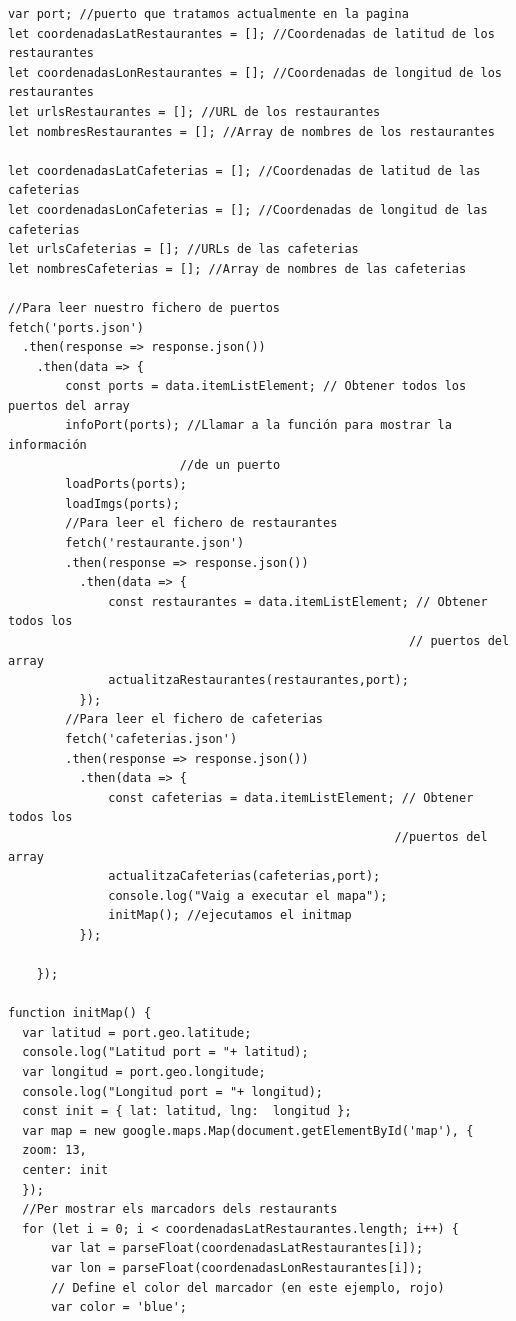 \documentclass{article}
\begin{document}
\begin{verbatim}
var port; //puerto que tratamos actualmente en la pagina
let coordenadasLatRestaurantes = []; //Coordenadas de latitud de los restaurantes
let coordenadasLonRestaurantes = []; //Coordenadas de longitud de los restaurantes
let urlsRestaurantes = []; //URL de los restaurantes 
let nombresRestaurantes = []; //Array de nombres de los restaurantes 

let coordenadasLatCafeterias = []; //Coordenadas de latitud de las cafeterias
let coordenadasLonCafeterias = []; //Coordenadas de longitud de las cafeterias
let urlsCafeterias = []; //URLs de las cafeterias 
let nombresCafeterias = []; //Array de nombres de las cafeterias 

//Para leer nuestro fichero de puertos
fetch('ports.json')
  .then(response => response.json())
    .then(data => {
        const ports = data.itemListElement; // Obtener todos los puertos del array
        infoPort(ports); //Llamar a la función para mostrar la información 
                        //de un puerto
        loadPorts(ports); 
        loadImgs(ports);
        //Para leer el fichero de restaurantes
        fetch('restaurante.json')
        .then(response => response.json())
          .then(data => {
              const restaurantes = data.itemListElement; // Obtener todos los 
                                                        // puertos del array
              actualitzaRestaurantes(restaurantes,port);
          });
        //Para leer el fichero de cafeterias
        fetch('cafeterias.json')
        .then(response => response.json())
          .then(data => {
              const cafeterias = data.itemListElement; // Obtener todos los 
                                                      //puertos del array
              actualitzaCafeterias(cafeterias,port);
              console.log("Vaig a executar el mapa");
              initMap(); //ejecutamos el initmap
          });
        
    });

function initMap() {
  var latitud = port.geo.latitude;
  console.log("Latitud port = "+ latitud);
  var longitud = port.geo.longitude;
  console.log("Longitud port = "+ longitud);
  const init = { lat: latitud, lng:  longitud };
  var map = new google.maps.Map(document.getElementById('map'), {
  zoom: 13,
  center: init
  });
  //Per mostrar els marcadors dels restaurants
  for (let i = 0; i < coordenadasLatRestaurantes.length; i++) {
      var lat = parseFloat(coordenadasLatRestaurantes[i]);
      var lon = parseFloat(coordenadasLonRestaurantes[i]);
      // Define el color del marcador (en este ejemplo, rojo)
      var color = 'blue';


\end{verbatim}
\end{document}
